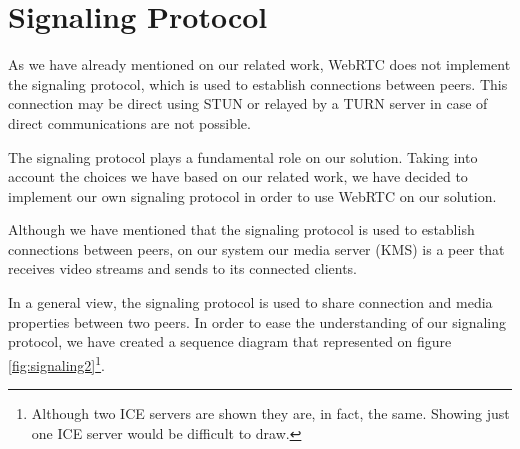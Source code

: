 \section{Signaling Protocol}

As we have already mentioned on our related work, \ac{WebRTC} does not implement the signaling protocol, which is used to establish connections between peers. This connection may be direct using \ac{STUN} or relayed by a \ac{TURN} server in case of direct communications are not possible.

The signaling protocol plays a fundamental role on our solution. Taking into account the choices we have based on our related work, we have decided to implement our own signaling protocol in order to use \ac{WebRTC} on our solution.

Although we have mentioned that the signaling protocol is used to establish connections between peers, on our system our media server (\ac{KMS}) is a peer that receives video streams and sends to its connected clients. 

In a general view, the signaling protocol is used to share connection and media properties between two peers. In order to ease the understanding of our signaling protocol, we have created a sequence diagram that represented on figure \ref{fig:signaling2}\footnote{Although two \ac{ICE} servers are shown they are, in fact, the same. Showing just one \ac{ICE} server would be difficult to draw.}.


